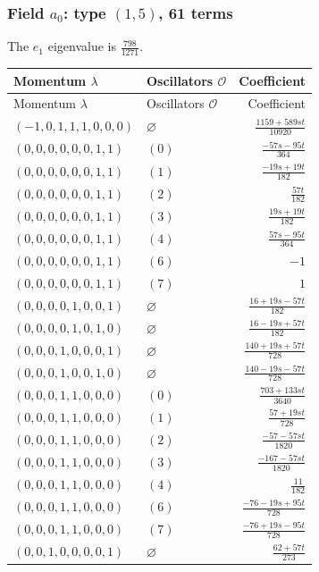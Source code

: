 \subsubsection{\texorpdfstring{Field $a_{0}$: type $(1,5)$, 61 terms}{Field a0: type (1,5), 61 terms}}
The $e_1$ eigenvalue is $\frac{798}{1271}$. 
\begingroup\scriptsize\setlength{\tabcolsep}{3pt}\renewcommand{\arraystretch}{1.35}
\begin{longtable}{@{}llr@{}}
\toprule Momentum $\lambda$&Oscillators $\mathcal O$&Coefficient\\\midrule\endfirsthead
\toprule Momentum $\lambda$&Oscillators $\mathcal O$&Coefficient\\\midrule\endhead
\bottomrule\endfoot
$(-1,0,1,1,1,0,0,0)$ & $\varnothing$ & $\frac{1159+589st}{10920}$\\
$(0,0,0,0,0,0,1,1)$ & $(0)$ & $\frac{-57s-95t}{364}$\\
$(0,0,0,0,0,0,1,1)$ & $(1)$ & $\frac{-19s+19t}{182}$\\
$(0,0,0,0,0,0,1,1)$ & $(2)$ & $\frac{57t}{182}$\\
$(0,0,0,0,0,0,1,1)$ & $(3)$ & $\frac{19s+19t}{182}$\\
$(0,0,0,0,0,0,1,1)$ & $(4)$ & $\frac{57s-95t}{364}$\\
$(0,0,0,0,0,0,1,1)$ & $(6)$ & $-1$\\
$(0,0,0,0,0,0,1,1)$ & $(7)$ & $1$\\
$(0,0,0,0,1,0,0,1)$ & $\varnothing$ & $\frac{16+19s-57t}{182}$\\
$(0,0,0,0,1,0,1,0)$ & $\varnothing$ & $\frac{16-19s+57t}{182}$\\
$(0,0,0,1,0,0,0,1)$ & $\varnothing$ & $\frac{140+19s+57t}{728}$\\
$(0,0,0,1,0,0,1,0)$ & $\varnothing$ & $\frac{140-19s-57t}{728}$\\
$(0,0,0,1,1,0,0,0)$ & $(0)$ & $\frac{703+133st}{3640}$\\
$(0,0,0,1,1,0,0,0)$ & $(1)$ & $\frac{57+19st}{728}$\\
$(0,0,0,1,1,0,0,0)$ & $(2)$ & $\frac{-57-57st}{1820}$\\
$(0,0,0,1,1,0,0,0)$ & $(3)$ & $\frac{-167-57st}{1820}$\\
$(0,0,0,1,1,0,0,0)$ & $(4)$ & $\frac{11}{182}$\\
$(0,0,0,1,1,0,0,0)$ & $(6)$ & $\frac{-76-19s+95t}{728}$\\
$(0,0,0,1,1,0,0,0)$ & $(7)$ & $\frac{-76+19s-95t}{728}$\\
$(0,0,1,0,0,0,0,1)$ & $\varnothing$ & $\frac{62+57t}{273}$\\

\end{longtable}
